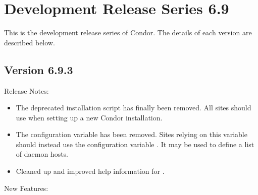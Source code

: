 
\section{\label{sec:History-6-9}Development Release Series 6.9}

This is the development release series of Condor.
The details of each version are described below.

\subsection*{\label{sec:New-6-9-3}Version 6.9.3}

\noindent Release Notes:

\begin{itemize}

\item The deprecated  installation script has
  finally been removed.
  All sites should use  when setting up a new Condor
  installation.

\item The  configuration variable has
  been removed.
  Sites relying on this variable should instead use the configuration
  variable . It may be used to
  define a list of  daemon hosts.

\item Cleaned up and improved help information for .

\end{itemize}


\noindent New Features:

